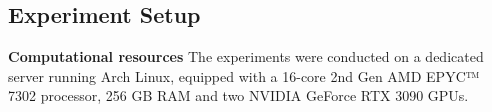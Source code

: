 



\vspace{-1.2em}
\subsection{Experiment Setup}
\noindent \textbf{Computational resources} 
The experiments were conducted on a dedicated server running Arch Linux, equipped with a 16-core 2nd Gen AMD EPYC™ 7302 processor, 256 GB RAM and two NVIDIA GeForce RTX 3090 GPUs.

